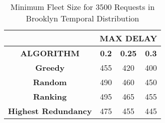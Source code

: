 \documentclass[urop]{socreport}
\begin{document}
\begin{table}[h!]
    \centering
    \begin{tabular}{|c|c|c|c|}
        \hline
         & \multicolumn{3}{|c|}{\textbf{MAX DELAY}}\\
         \hline
         \textbf{ALGORITHM} & \textbf{0.2} & \textbf{0.25}& \textbf{0.3}\\
         \hline \hline
         \textbf{Greedy} & 455 & 420 & 400\\
         \hline
         \textbf{Random} & 490 & 460& 450\\
         \hline
         \textbf{Ranking} & 495 & 465 & 455\\
         \hline
         \textbf{Highest Redundancy} & 475 & 455 & 445\\
        \hline
    \end{tabular}
    \caption{Minimum Fleet Size for 3500 Requests in Brooklyn Temporal Distribution}
    \label{tab:exp3_peakt3500}
\end{table}
\end{document}
